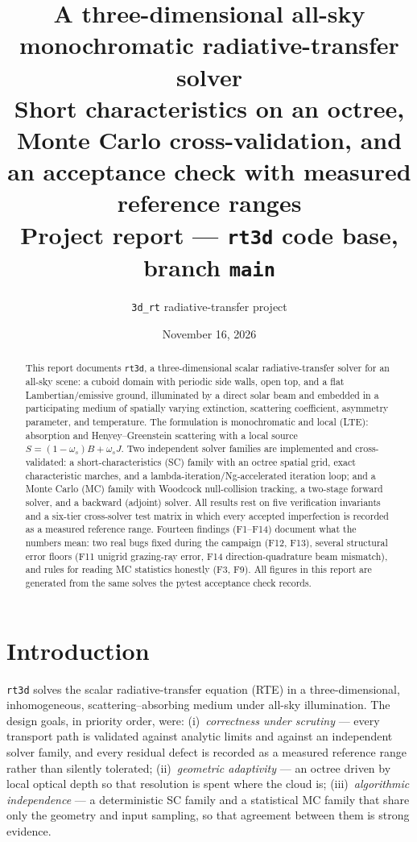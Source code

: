 \documentclass[11pt,a4paper]{article}
\title{\texorpdfstring{\bfseries A three-dimensional all-sky monochromatic
radiative-transfer solver\\[0.4em]
\large Short characteristics on an octree, Monte Carlo cross-validation,
and an acceptance check with measured reference ranges\\[0.6em]
\normalsize Project report --- \texttt{rt3d} code base, branch \texttt{main}}
{A three-dimensional all-sky monochromatic radiative-transfer solver:
short characteristics on an octree, Monte Carlo cross-validation,
and an acceptance check with measured reference ranges}}
\author{\texttt{3d\_rt} radiative-transfer project}
\date{November 16, 2026}
\begin{document}
\maketitle

\begin{abstract}
\noindent
This report documents \texttt{rt3d}, a three-dimensional scalar
radiative-transfer solver for an all-sky scene: a cuboid domain with
periodic side walls, open top, and a flat Lambertian/emissive ground,
illuminated by a direct solar beam and embedded in a participating medium
of spatially varying extinction, scattering coefficient, asymmetry
parameter, and temperature. The formulation is monochromatic and local
(LTE): absorption and Henyey--Greenstein scattering with a local source
$S=(1-\omega_s)B+\omega_s J$. Two independent solver families are
implemented and cross-validated: a short-characteristics (SC) family with
an octree spatial grid, exact characteristic marches, and a
lambda-iteration/Ng-accelerated iteration loop; and a Monte Carlo (MC)
family with Woodcock null-collision tracking, a two-stage forward solver,
and a backward (adjoint) solver. All results rest on five verification invariants
and a six-tier cross-solver test matrix in which every accepted
imperfection is recorded as a measured reference range. Fourteen findings
(F1--F14) document what the numbers mean: two real bugs fixed during the
campaign (F12, F13), several structural error floors (F11 unigrid
grazing-ray error, F14 direction-quadrature beam mismatch), and rules
for reading MC statistics honestly (F3, F9). All figures in this report
are generated from the same solves the pytest acceptance check records.
\end{abstract}

\tableofcontents

\section{Introduction}

\texttt{rt3d} solves the scalar radiative-transfer equation (RTE) in a
three-dimensional, inhomogeneous, scattering--absorbing medium under
all-sky illumination. The design goals, in priority order, were:
(i)~\emph{correctness under scrutiny} --- every transport path is validated
against analytic limits and against an independent solver family, and every
residual defect is recorded as a measured reference range rather than
silently tolerated;
(ii)~\emph{geometric adaptivity} --- an octree driven by local optical
depth so that resolution is spent where the cloud is;
(iii)~\emph{algorithmic independence} --- a deterministic SC family and a
statistical MC family that share only the geometry and input sampling, so
that agreement between them is strong evidence.
\end{document}
